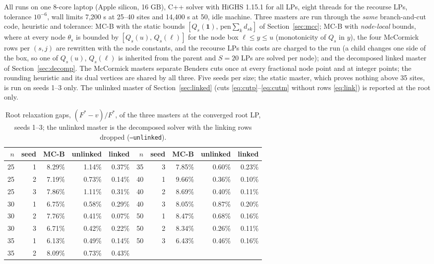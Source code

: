 \documentclass[11pt]{article}
\newcommand{\pen}{\mathrm{pen}}
\begin{document}
All runs on one 8-core laptop (Apple silicon, 16 GB), C++ solver with HiGHS 1.15.1 for all LPs, eight threads for the
recourse LPs, tolerance $10^{-6}$, wall limits 7,200 s at 25--40 sites and 14,400 s at 50, idle machine. Three
masters are run through the \emph{same} branch-and-cut code, heuristic and tolerance: \textsc{MC-B} with the static
bounds $[Q_s(\mathbf 1),\,\pen\sum_k d_{sk}]$ of Section~\ref{sec:mcc}; \textsc{MC-B} with \emph{node-local} bounds,
where at every node $\theta_s$ is bounded by $[Q_s(u),\,Q_s(\ell)]$ for the node box $\ell\le y\le u$ (monotonicity of
$Q_s$ in $y$), the four McCormick rows per $(s,j)$ are rewritten with the node constants, and the recourse LPs this
costs are charged to the run (a child changes one side of the box, so one of $Q_s(u)$, $Q_s(\ell)$ is inherited from
the parent and $S = 20$ LPs are solved per node); and the decomposed linked master of Section~\ref{sec:decomp}. The
McCormick masters separate Benders cuts once at every fractional node point and at integer points; the rounding
heuristic and its dual vertices are shared by all three. Five seeds per size; the static master, which proves
nothing above 35 sites, is run on seeds 1--3 only. The unlinked master of Section~\ref{sec:linked} (cuts
\eqref{eq:cutp}--\eqref{eq:cutm} without rows \eqref{eq:link}) is reported at the root only.

\begin{table}[ht]
\centering\small
\caption{Root relaxation gaps, $(F^* - v)/F^*$, of the three masters at the converged root LP, seeds 1--3; the
unlinked master is the decomposed solver with the linking rows dropped (\texttt{--unlinked}).}
\label{tab:root}
\begin{tabular}{rr rrr @{\hspace{2em}} rr rrr}
\toprule
$n$ & seed & \textsc{MC-B} & unlinked & linked & $n$ & seed & \textsc{MC-B} & unlinked & linked\\
\midrule
25 & 1 & 8.29\% & 1.14\% & 0.37\% & 35 & 3 & 7.85\% & 0.60\% & 0.23\%\\
25 & 2 & 7.19\% & 0.73\% & 0.14\% & 40 & 1 & 9.66\% & 0.36\% & 0.10\%\\
25 & 3 & 7.86\% & 1.11\% & 0.31\% & 40 & 2 & 8.69\% & 0.40\% & 0.11\%\\
30 & 1 & 6.75\% & 0.58\% & 0.29\% & 40 & 3 & 8.05\% & 0.87\% & 0.20\%\\
30 & 2 & 7.76\% & 0.41\% & 0.07\% & 50 & 1 & 8.47\% & 0.68\% & 0.16\%\\
30 & 3 & 6.71\% & 0.42\% & 0.22\% & 50 & 2 & 8.34\% & 0.26\% & 0.11\%\\
35 & 1 & 6.13\% & 0.49\% & 0.14\% & 50 & 3 & 6.43\% & 0.46\% & 0.16\%\\
35 & 2 & 8.09\% & 0.73\% & 0.43\% & & & & & \\
\bottomrule
\end{tabular}
\end{table}
\end{document}
